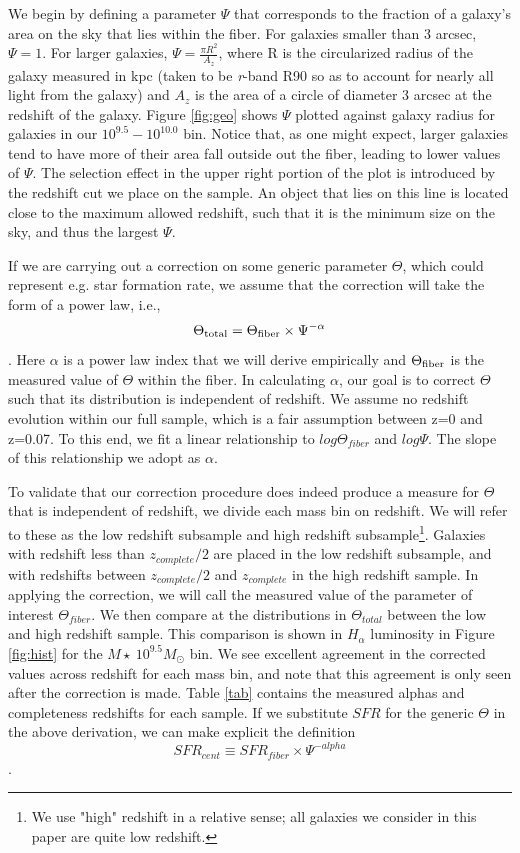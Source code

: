 \documentclass[iop]{emulateapj}
\begin{document}
We begin by defining a parameter $\Psi$ that corresponds to the fraction of a galaxy's area on the sky that lies within the fiber. For galaxies smaller than 3 arcsec, $\Psi = 1$. For larger galaxies, $\Psi = \frac{\pi R^2}{A_z}$, where R is the circularized radius of the galaxy measured in kpc (taken to be \textit{r}-band R90 so as to account for nearly all light from the galaxy) and $A_z$ is the area of a circle of diameter 3 arcsec at the redshift of the galaxy. Figure \ref{fig:geo} shows $\Psi$ plotted against galaxy radius for galaxies in our $10^{9.5}-10^{10.0}$ bin. Notice that, as one might expect, larger galaxies tend to have more of their area fall outside out the fiber, leading to lower values of $\Psi$. The selection effect in the upper right portion of the plot is introduced by the redshift cut we place on the sample. An object that lies on this line is located close to the maximum allowed redshift, such that it is the minimum size on the sky, and thus the largest $\Psi$. 

If we are carrying out a correction on some generic parameter $\Theta$, which could represent e.g. star formation rate, we assume that the correction will take the form of a power law, i.e., $$\Theta_{\rm total} = \Theta_{\rm fiber} \times \Psi^{-\alpha}$$. Here $\alpha$ is a power law index that we will derive empirically and $\Theta_{\rm fiber}$ is the measured value of $\Theta$ within the fiber. In calculating $\alpha$, our goal is to correct $\Theta$ such that its distribution is independent of redshift. We assume no redshift evolution within our full sample, which is a fair assumption between z=0 and z=0.07. To this end, we fit a linear relationship to $log \Theta_{fiber}$ and $log \Psi$. The slope of this relationship we adopt as $\alpha$.

To validate that our correction procedure does indeed produce a measure for $\Theta$ that is independent of redshift, we divide each mass bin on redshift. We will refer to these as the low redshift subsample and high redshift subsample\footnote{We use "high" redshift in a relative sense; all galaxies we consider in this paper are quite low redshift.}. Galaxies with redshift less than $z_{complete}/2$ are placed in the low redshift subsample, and with redshifts between $z_{complete}/2$ and  $z_{complete}$ in the high redshift sample. In applying the correction, we will call the measured value of the parameter of interest $\Theta_{fiber}$. We then compare at the distributions in $\Theta_{total}$ between the low and high redshift sample. This comparison is shown in $H_\alpha$ luminosity in Figure \ref{fig:hist} for the $M\star ~ 10^{9.5} M_{\odot}$ bin. We see excellent agreement in the corrected values across redshift for each mass bin, and note that this agreement is only seen after the correction is made. Table \ref{tab} contains the measured alphas and completeness redshifts for each sample. If we substitute $SFR$ for the generic $\Theta$ in the above derivation, we can make explicit the definition $$SFR_{cent} \equiv SFR_{fiber} \times \Psi^{-alpha}$$.
\end{document}
